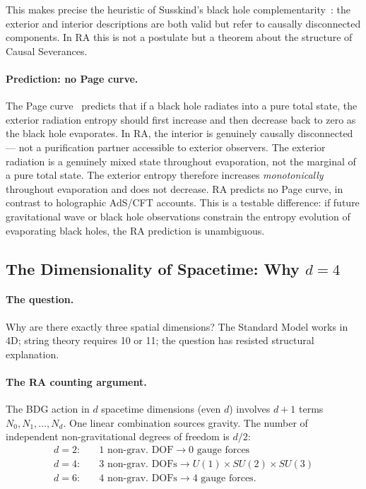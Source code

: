 \documentclass[11pt,a4paper]{article}
\begin{document}
This makes precise the heuristic of Susskind's black hole
complementarity~\citep{Susskind1993}: the exterior and interior
descriptions are both valid but refer to causally disconnected
components. In RA this is not a postulate but a theorem about the
structure of Causal Severances.

\paragraph{Prediction: no Page curve.}
The Page curve~\citep{Page1993} predicts that if a black hole radiates
into a pure total state, the exterior radiation entropy should first
increase and then decrease back to zero as the black hole evaporates.
In RA, the interior is genuinely causally disconnected --- not a
purification partner accessible to exterior observers. The exterior
radiation is a genuinely mixed state throughout evaporation, not the
marginal of a pure total state. The exterior entropy therefore increases
\emph{monotonically} throughout evaporation and does not decrease.
RA predicts no Page curve, in contrast to holographic AdS/CFT accounts.
This is a testable difference: if future gravitational wave or
black hole observations constrain the entropy evolution of evaporating
black holes, the RA prediction is unambiguous.

\subsection{The Dimensionality of Spacetime: Why $d = 4$}
\label{sec:dimensionality}

\paragraph{The question.}
Why are there exactly three spatial dimensions? The Standard Model
works in 4D; string theory requires 10 or 11; the question has
resisted structural explanation.

\paragraph{The RA counting argument.}
The BDG action in $d$ spacetime dimensions (even $d$) involves $d+1$
terms $N_0, N_1, \ldots, N_d$. One linear combination sources
gravity. The number of independent non-gravitational degrees of
freedom is $d/2$:
\begin{align}
  d = 2: &\quad 1 \text{ non-grav.\ DOF} \to 0 \text{ gauge forces} \\
  d = 4: &\quad 3 \text{ non-grav.\ DOFs} \to
  U(1)\times SU(2)\times SU(3) \\
  d = 6: &\quad 4 \text{ non-grav.\ DOFs} \to \text{4 gauge forces.}
\end{align}
\end{document}
